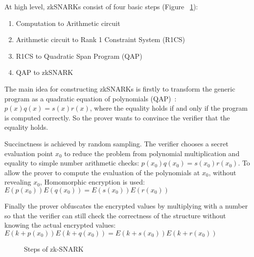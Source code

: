 At high level, zkSNARKs consist of four basic steps (Figure ~\ref{fig:zkp:zksnark_flow}):

\begin{enumerate}
  \item Computation to Arithmetic circuit~\cite{wiki:circuits}
  \item Arithmetic circuit to Rank 1 Constraint System (R1CS)~\cite{ggpr}
  \item R1CS to Quadratic Span Program (QAP)~\cite{ggpr}
  \item QAP to zkSNARK~\cite{pinocchio-nearly-practical-verifiable-computation}
\end{enumerate}

The main idea for constructing zkSNARKs is firstly to transform the generic program as a quadratic equation of polynomials (QAP)~\cite{ggpr}: $p(x)q(x) = s(x)r(x)$, where the equality holds if and only if the program is computed correctly. So the prover wants to convince the verifier that the equality holds.

Succinctness is achieved by random sampling. The verifier chooses a secret evaluation point $x_0$ to reduce the problem from polynomial multiplication and equality to simple number arithmetic checks: $p(x_0)q(x_0) = s(x_0)r(x_0)$. To allow the prover to compute the evaluation of the polynomials at $x_0$, without revealing $x_0$, Homomorphic encryption is used:  $E(p(x_0))E(q(x_0)) = E(s(x_0))E(r(x_0))$

Finally the prover obfuscates the encrypted values by multiplying with a number so that the verifier can still check the correctness of the structure without knowing the actual
encrypted values: $E(k + p(x_0))E(k + q(x_0)) = E(k + s(x_0))E(k + r(x_0))$

\begin{figure}[ht!]
  \caption{Steps of zk-SNARK}
  \label{fig:zkp:zksnark_flow}
\end{figure}

